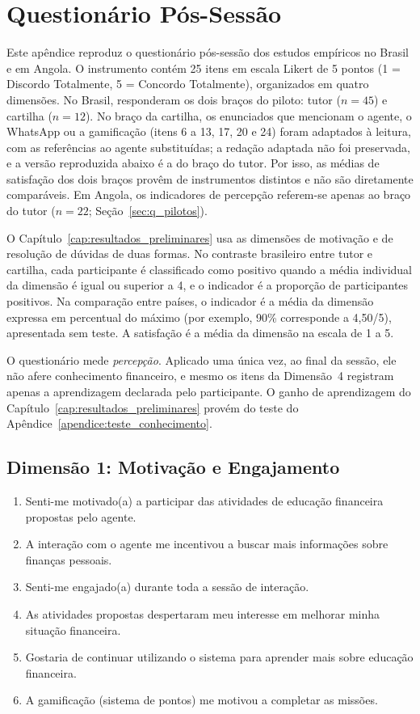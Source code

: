 \chapter{Questionário Pós-Sessão}
\label{apendice:questionario}

Este apêndice reproduz o questionário pós-sessão dos estudos empíricos no Brasil e em Angola. O instrumento contém 25 itens em escala Likert de 5 pontos (1 = Discordo Totalmente, 5 = Concordo Totalmente), organizados em quatro dimensões. No Brasil, responderam os dois braços do piloto: tutor ($n = 45$) e cartilha ($n = 12$). No braço da cartilha, os enunciados que mencionam o agente, o WhatsApp ou a gamificação (itens 6 a 13, 17, 20 e 24) foram adaptados à leitura, com as referências ao agente substituídas; a redação adaptada não foi preservada, e a versão reproduzida abaixo é a do braço do tutor. Por isso, as médias de satisfação dos dois braços provêm de instrumentos distintos e não são diretamente comparáveis. Em Angola, os indicadores de percepção referem-se apenas ao braço do tutor ($n = 22$; Seção~\ref{sec:q_pilotos}).

O Capítulo~\ref{cap:resultados_preliminares} usa as dimensões de motivação e de resolução de dúvidas de duas formas. No contraste brasileiro entre tutor e cartilha, cada participante é classificado como positivo quando a média individual da dimensão é igual ou superior a 4, e o indicador é a proporção de participantes positivos. Na comparação entre países, o indicador é a média da dimensão expressa em percentual do máximo (por exemplo, 90\% corresponde a 4,50/5), apresentada sem teste. A satisfação é a média da dimensão na escala de 1 a 5.

O questionário mede \emph{percepção}. Aplicado uma única vez, ao final da sessão, ele não afere conhecimento financeiro, e mesmo os itens da Dimensão~4 registram apenas a aprendizagem declarada pelo participante. O ganho de aprendizagem do Capítulo~\ref{cap:resultados_preliminares} provém do teste do Apêndice~\ref{apendice:teste_conhecimento}.

\section*{Dimensão 1: Motivação e Engajamento}

\begin{enumerate}
    \item Senti-me motivado(a) a participar das atividades de educação financeira propostas pelo agente.
    \item A interação com o agente me incentivou a buscar mais informações sobre finanças pessoais.
    \item Senti-me engajado(a) durante toda a sessão de interação.
    \item As atividades propostas despertaram meu interesse em melhorar minha situação financeira.
    \item Gostaria de continuar utilizando o sistema para aprender mais sobre educação financeira.
    \item A gamificação (sistema de pontos) me motivou a completar as missões.
\end{enumerate}

